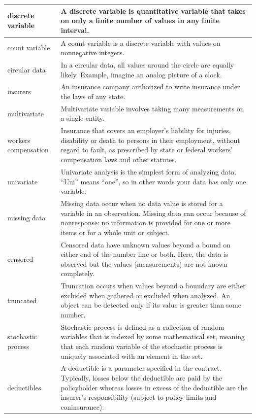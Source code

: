 \documentclass[
]{book}
\begin{document}
\begin{longtable}{>{\raggedright\arraybackslash}p{10em}|>{\raggedright\arraybackslash}p{30em}}
\hline
discrete variable & A discrete variable is quantitative variable that takes on only a finite number of values in any finite interval.\\
\hline
count variable & A count variable is a discrete variable with values on nonnegative integers.\\
\hline
circular data & In a circular data, all values around the circle are equally likely. Example, imagine an analog picture of a clock.\\
\hline
insurers & An insurance company authorized to write insurance under the laws of any state.\\
\hline
multivariate & Multivariate variable involves taking many measurements on a single entity.\\
\hline
workers compensation & Insurance that covers an employer's liability for injuries, disability or death to persons in their employment, without regard to fault, as prescribed by state or federal workers' compensation laws and other statutes.\\
\hline
univariate & Univariate analysis is the simplest form of analyzing data. “Uni” means “one”, so in other words your data has only one variable.\\
\hline
missing data & Missing data occur when no data value is stored for a variable in an observation. Missing data can occur because of nonresponse: no information is provided for one or more items or for a whole unit or subject.\\
\hline
censored & Censored data have unknown values beyond a bound on either end of the number line or both. Here, the data is observed but the values (measurements) are not known completely.\\
\hline
truncated & Truncation occurs when values beyond a boundary are either excluded when gathered or excluded when analyzed. An object can be detected only if its value is greater than some number.\\
\hline
stochastic process & Stochastic process is defined as a collection of random variables that is indexed by some mathematical set, meaning that each random variable of the stochastic process is uniquely associated with an element in the set.\\
\hline
deductibles & A deductible is a parameter specified in the contract. Typically, losses below the deductible are paid by the policyholder whereas losses in excess of the deductible are the insurer's responsibility (subject to policy limits and coninsurance).\\

\end{longtable}
\end{document}
